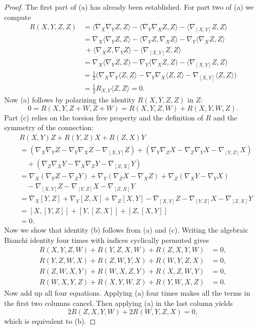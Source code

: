 \begin{proof}
The first part of (a) has already been established. For part two of (a) we compute
\begin{align*}
R(X,Y,Z,Z)&=\langle\nabla_X\nabla_YZ,Z\rangle-\langle\nabla_Y\nabla_XZ,Z\rangle-\langle\nabla_{[X,Y]}Z,Z\rangle\\
&=\nabla_X\langle\nabla_YZ,Z\rangle-\langle\nabla_YZ,\nabla_XZ\rangle-\nabla_Y\langle\nabla_XZ,Z\rangle\\
&\ +\langle\nabla_XZ,\nabla_YZ\rangle-\langle\nabla_{[X,Y]}Z,Z\rangle\\
&=\nabla_X\langle\nabla_YZ,Z)-\nabla_Y\langle\nabla_XZ,Z)-\langle\nabla_{[X,Y]}Z,Z)\\
&=\frac{1}{2}\big(\nabla_X\nabla_Y\langle Z,Z\rangle-\nabla_Y\nabla_X\langle Z,Z\rangle-\nabla_{[X,Y]}\langle Z,Z\rangle\big)\\
&=\frac{1}{2}R_{X,Y}\langle Z,Z\rangle=0.
\end{align*}
Now (a) follows by polarizing the identity $R(X,Y,Z,Z)$ in $Z$:
\[0=R(X,Y,Z+W,Z+W)=R(X,Y,Z,W)+R(X,Y,W,Z).\]
Part (c) relies on the torsion free property and the definition of $R$ and the symmetry of the connection:
\begin{align*}
&R(X,Y)Z+R(Y,Z)X+R(Z,X)Y\\
&=(\nabla_X\nabla_YZ-\nabla_Y\nabla_XZ-\nabla_{[X,Y]}Z)+(\nabla_Y\nabla_ZX-\nabla_Z\nabla_YX-\nabla_{[Y,Z]}X)\\
&\quad+(\nabla_Z\nabla_XY-\nabla_X\nabla_ZY-\nabla_{[Z,X]}Y)\\
&=\nabla_X(\nabla_YZ-\nabla_ZY)+\nabla_Y(\nabla_ZX-\nabla_XZ)+\nabla_Z(\nabla_XY-\nabla_YX)\\
&\quad-\nabla_{[X,Y]}Z-\nabla_{[Y,Z]}X-\nabla_{[Z,X]}Y\\
&=\nabla_X[Y,Z]+\nabla_Y[Z,X]+\nabla_Z[X,Y]-\nabla_{[X,Y]}Z-\nabla_{[Y,Z]}X-\nabla_{[Z,X]}Y\\
&=[X,[Y,Z]]+[Y,[Z,X]]+[Z,[X,Y]]\\
&=0.
\end{align*}
Now we show that identity (b) follows from (a) and (c). Writing the algebraic Bianchi identity four times with indices cyclically permuted gives
\begin{align*}
R(X,Y,Z,W)+R(Y,Z,X,W)+R(Z,X,Y,W)&=0,\\
R(Y,Z,W,X)+R(Z,W,Y,X)+R(W,Y,Z,X)&=0,\\
R(Z,W,X,Y)+R(W,X,Z,Y)+R(X,Z,W,Y)&=0,\\
R(W,X,Y,Z)+R(X,Y,W,Z)+R(Y,W,X,Z)&=0.
\end{align*}
Now add up all four equations. Applying (a) four times makes all the terms in the first two columns cancel. Then applying (a) in the last column yields
\[2R(Z,X,Y,W)+2R(W,Y,Z,X)=0,\]
which is equivalent to (b).
\end{proof}
